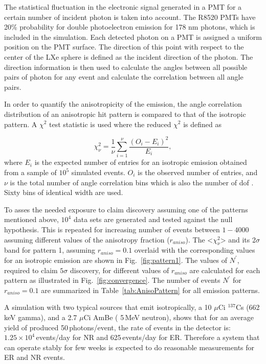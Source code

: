 The statistical fluctuation 
in the electronic signal generated in a PMT for a certain number of incident photon is 
taken into account. The R8520 PMTs have 20\% probability 
for double photoelectron emission for 178 nm photons, which is included in the simulation.
Each detected photon on a PMT is assigned a uniform position on the PMT surface. 
The direction of this point with respect 
to the center of the LXe sphere is defined as the incident direction of the photon. The direction information 
is then used to calculate the angles between all possible pairs of photon for any event and 
calculate the correlation between all angle pairs. 

In order to quantify the anisotropicity of the emission, 
the angle correlation distribution of an anisotropic hit pattern is compared to that of the isotropic 
pattern. A $\chi^2$ test statistic is used where the reduced $\chi^2$ is defined as 

\begin{equation}
\chi^2_\nu = \frac{1}{\nu} \sum^{\nu}_{i=1} \frac{(O_i - E_i)^2}{E_i},
\label{redchi2}
\end{equation}
where $E_i$ is the expected number of entries for an isotropic emission obtained from a sample of $10^5$ simulated events. 
$O_i$ is the observed number of entries, and $\nu$ is the total number of angle correlation bins 
which is also the number of dof . Sixty bins of identical width are used.


To asses the needed exposure to claim discovery assuming one of the patterns mentioned above, $10^4$ data sets are generated and tested against the null hypothesis. This is repeated for increasing number of events between $1-4000$ assuming different values of the anisotropy fraction ($r_{aniso}$). The <$\chi^2_\nu$> 
and its 2$\sigma$ band for pattern 1, assuming $r_{aniso} =0.1$ overlaid with the corresponding values  for an isotropic emission are shown in Fig.~\ref{fig:pattern1}.  
The values of $N^{'}$, required to claim $5\sigma$ discovery, for different values of $r_{aniso}$ are calculated for each pattern as illustrated in Fig.~\ref{fig:convergence}.
The number of events 
$N^{'}$ for $r_{aniso} =0.1$ are summarized in Table~\ref{tab:AnisoPattern} for all emission patterns.

A simulation with two typical sources that emit isotropically, a 10 $\mu$Ci $^{137}$Cs (662\,keV gamma), and a 2.7 $\mu$Ci AmBe ( 5\,MeV neutron), shows that for an average yield of produced 
50\,photons/event,  the rate of events in the detector is: $1.25\times10^{4}$\,events/day for NR and 625\,events/day for ER. 
Therefore a system that can operate stably for few weeks 
is expected to do reasonable measurements for ER and NR events.


